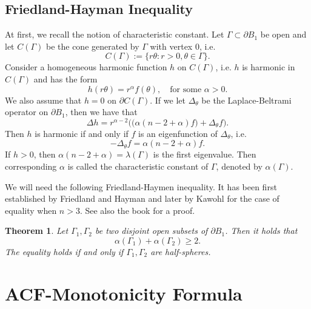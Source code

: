 \documentclass{article}
\newtheorem{theorem}{Theorem}[section]
\theoremstyle{remark}
\numberwithin{equation}{section}
\theoremstyle{definition}
\begin{document}
\subsection{Friedland-Hayman Inequality}
At first, we recall the notion of characteristic constant. Let $\Gamma \subset \partial B_{1}$ be open and let $C(\Gamma)$ be the cone generated by $\Gamma$ with vertex $0$, i.e.
\begin{equation}
	C(\Gamma) := \{r\theta: r >0,\theta \in \Gamma\}.
\end{equation}
Consider a homogeneous harmonic function $h$ on $C(\Gamma)$, i.e. $h$ is harmonic in $C(\Gamma)$ and has the form
\begin{equation}
	h(r\theta) = r^{\alpha}f(\theta),\quad \text{for some } \alpha>0.
\end{equation}
We also assume that $h=0$ on $\partial C(\Gamma)$. If we let $\Delta_{\theta}$ be the Laplace-Beltrami operator on $\partial B_{1}$, then we have that
\begin{equation}
	\Delta h = r^{\alpha-2}\Big(\big(\alpha(n-2+\alpha)f\big)+\Delta_{\theta}f \Big).
\end{equation}
Then $h$ is harmonic if and only if $f$ is an eigenfunction of $\Delta_{\theta}$, i.e.
\begin{equation}
	-\Delta_{\theta}f = \alpha(n-2+\alpha)f.
\end{equation}
If $h>0$, then $\alpha(n-2+\alpha)=\lambda(\Gamma)$ is the first eigenvalue. Then corresponding $\alpha$ is called the characteristic constant of $\Gamma$, denoted by $\alpha(\Gamma)$.

We will need the following Friedland-Haymen inequality. It has been first established by Friedland and Hayman \cite{Friedland-Hayman_1976} and later by Kawohl \cite{Kawohl_1986} for the case of equality when $n>3$. See also the book \cite[Chapter 12]{Caffarelli-Salsa_2005} for a proof.
\begin{theorem}\label{Friedland-Haymen_inequality}
	Let $\Gamma_{1},\Gamma_{2}$ be two disjoint open subsets of $\partial B_{1}$. Then it holds that
	\begin{equation}
		\alpha(\Gamma_{1})+\alpha(\Gamma_{2}) \ge 2.
	\end{equation}
	The equality holds if and only if $\Gamma_{1},\Gamma_{2}$ are half-spheres.
\end{theorem}

\section{ACF-Monotonicity Formula}
\end{document}
